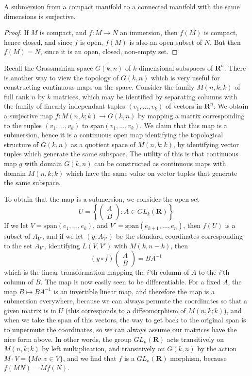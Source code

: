\begin{corollary}
    A submersion from a compact manifold to a connected manifold with the same dimensions is surjective.
\end{corollary}
\begin{proof}
    If $M$ is compact, and $f: M \to N$ an immersion, then $f(M)$ is compact, hence closed, and since $f$ is open, $f(M)$ is also an open subset of $N$. But then $f(M) = N$, since it is an open, closed, non-empty set.
\end{proof}

\begin{example}
    Recall the Grassmanian space $G(k,n)$ of $k$ dimensional subspaces of $\mathbf{R}^n$. There is another way to view the topology of $G(k,n)$ which is very useful for constructing continuous maps on the space. Consider the family $M(n,k;k)$ of full rank $n$ by $k$ matrices, which may be identified by separating columns with the family of linearly independant tuples $(v_1, \dots, v_k)$ of vectors in $\mathbf{R}^n$. We obtain a surjective map $f: M(n,k;k) \to G(k,n)$ by mapping a matrix corresponding to the tuples $(v_1, \dots, v_k)$ to $\text{span}(v_1, \dots, v_k)$. We claim that this map is a submersion, hence it is a continuous open map identifying the topological structure of $G(k,n)$ as a quotient space of $M(n,k;k)$, by identifying vector tuples which generate the same subspace. The utility of this is that continuous map $g$ with domain $G(k,n)$ can be constructed as continuous maps with domain $M(n,k;k)$ which have the same value on vector tuples that generate the same subspace.

    To obtain that the map is a submersion, we consider the open set
    \[ U = \left\{ \begin{pmatrix} A \\ B \end{pmatrix}: A \in GL_k(\mathbf{R}) \right\} \]
    If we let $V = \text{span}(e_1, \dots, e_k)$, and $V' = \text{span}(e_{k+1}, \dots, e_n)$, then $f(U)$ is a subset of $A_{V'}$, and if we let $(y,A_{V'})$ be the standard coordinates corresponding to the set $A_{V'}$, identifying $L(V,V')$ with $M(k,n-k)$, then
    \[ (y \circ f) \begin{pmatrix} A \\ B \end{pmatrix} = BA^{-1} \]
    which is the linear transformation mapping the $i$'th column of $A$ to the $i$'th column of $B$. The map is now easily seen to be differentiable. For a fixed $A$, the map $B \mapsto BA^{-1}$ is an invertible linear map, and therefore the map is a submersion everywhere, because we can always permute the coordinates so that a given matrix is in $U$ (this corresponds to a diffeomorphism of $M(n,k;k)$), and when we take the span of this vectors, the way to get back to the original span is to unpermute the coordinates, so we can always assume our matrices have the nice form above. In other words, the group $GL_n(\mathbf{R})$ acts transitively on $M(n,k;k)$ by left multiplication, and transitively on $G(k,n)$ by the action $M \cdot V = \{ Mv : v \in V \}$, and we find that $f$ is a $GL_n(\mathbf{R})$ morphism, because $f(MN) = Mf(N)$.
\end{example}

